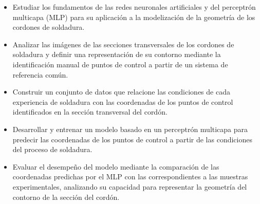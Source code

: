 \begin{itemize}

\item Estudiar los fundamentos de las redes neuronales artificiales y del perceptrón multicapa (MLP) para su aplicación a la modelización de la geometría de los cordones de soldadura.

\item Analizar las imágenes de las secciones transversales de los cordones de soldadura y definir una representación de su contorno mediante la identificación manual de puntos de control a partir de un sistema de referencia común.

\item Construir un conjunto de datos que relacione las condiciones de cada experiencia de soldadura con las coordenadas de los puntos de control identificados en la sección transversal del cordón.

\item Desarrollar y entrenar un modelo basado en un perceptrón multicapa para predecir las coordenadas de los puntos de control a partir de las condiciones del proceso de soldadura.

\item Evaluar el desempeño del modelo mediante la comparación de las coordenadas predichas por el MLP con las correspondientes a las muestras experimentales, analizando su capacidad para representar la geometría del contorno de la sección del cordón.

\end{itemize}
